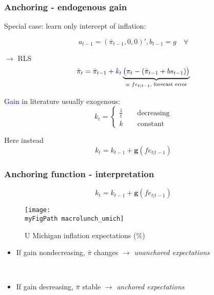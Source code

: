 \documentclass{beamer}
\def \myFigPath {../../figures/}
\begin{document}
\begin{frame}
	\frametitle{Anchoring - endogenous gain}
	\label{anchoring1}
Special case: learn only intercept of inflation:

\begin{equation}
a_{t-1} = (\bar{\pi}_{t-1},0,0)', b_{t-1} = g \quad \forall 
\end{equation}

$\rightarrow$ RLS
\begin{equation}
\bar{\pi}_{t}  =\bar{\pi}_{t-1} +\textcolor{blue}{k_t} \underbrace{\big(\pi_{t} -(\bar{\pi}_{t-1}+b s_{t-1}) \big)}_{\equiv \; fe_{t|t-1} \text{, forecast error} } 
\end{equation}
 
\hfill \hyperlink{RLS}{}

\textcolor{blue}{Gain} in literature usually exogenous: 
\begin{equation*}
k_t = \begin{cases}\frac{1}{t} \quad \quad \text{decreasing}\\
k \quad \quad \text{constant}
\end{cases}
\end{equation*}

Here instead
\begin{equation}
k_t = k_{t-1} + \mathbf{g}(fe_{t|t-1}) \label{gain}
\end{equation}
\hfill \hyperlink{g}{}



\end{frame}

\begin{frame}
	\frametitle{Anchoring function - interpretation}
	\label{anchoring_function}
	
\begin{equation*}
k_t = k_{t-1} + \mathbf{g}(fe_{t|t-1}) 
\end{equation*}

\begin{figure}[h!]
\caption{U Michigan inflation expectations (\%)}
\texttt{[image: \\myFigPath macrolunch\_umich]}
\end{figure}

\begin{itemize}
\item If gain nondecreasing, $\bar{\pi}$ changes $\rightarrow$ \emph{unanchored expectations}

\

\item If gain decreasing, $\bar{\pi}$ stable $\rightarrow$ \emph{anchored expectations}
\end{itemize}



\end{frame}
\end{document}
